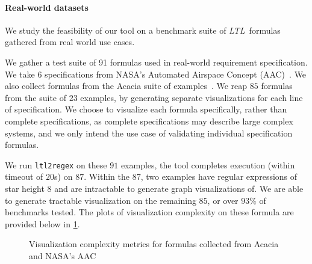 \documentclass[conference]{IEEEtran}
\theoremstyle{definition}
\theoremstyle{remark}
\newcommand{\ltl}{\textit{LTL}}
\begin{document}
\paragraph{Real-world datasets} We study the feasibility of our tool on a benchmark suite of \ltl\ formulas gathered from real world use cases.

We gather a test suite of 91 formulas used in real-world requirement specification. We take $6$ specifications from NASA's Automated Airspace Concept (AAC)~\cite{GCMTR16}. We also collect formulas from the Acacia suite of examples~\cite{RV10}. We reap $85$ formulas from the suite of $23$ examples, by generating separate visualizations for each line of specification. We choose to visualize each formula specifically, rather than complete specifications, as complete specifications may describe large complex systems, and we only intend the use case of validating individual specification formulas. %

We run \texttt{ltl2regex} on these $91$ examples, the tool completes execution (within timeout of $20$s) on $87$. Within the $87$, two examples have regular expressions of star height $8$ and are intractable to generate graph visualizations of. We are able to generate tractable visualization on the remaining $85$, or over $93\%$ of benchmarks tested. The plots of visualization complexity on these formula are provided below in \cref{fig:real-world}.


\begin{figure}[h!]
    \centering
    \quad %
    \caption{Visualization complexity metrics for formulas collected from Acacia~\cite{RV10} and NASA's  AAC~\cite{GCMTR16}}
    \label{fig:real-world}
\end{figure}
\end{document}
